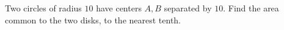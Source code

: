 Two circles of radius $10$ have centers $A,B$ separated by $10$. Find the area common to the two disks, to the nearest tenth.
